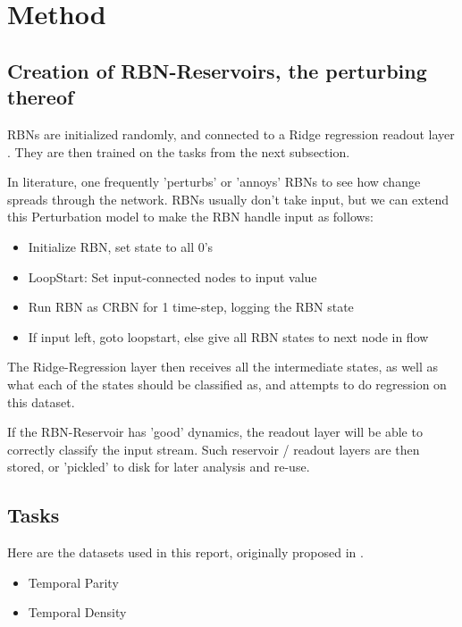 \section{Method}

\subsection{Creation of RBN-Reservoirs, the perturbing thereof}

RBNs are initialized randomly, and connected to a Ridge regression readout layer \cite{WhatIsRidgeRegression?}.
They are then trained on the tasks from the next subsection.

In literature, one frequently 'perturbs' or 'annoys' RBNs to see how change spreads through the network. \cite{CitationMissing}
RBNs usually don't take input, but we can extend this Perturbation model to make the RBN handle input as follows:

\begin{itemize}
  \item Initialize RBN, set state to all 0's
  \item LoopStart: Set input-connected nodes to input value
  \item Run RBN as CRBN for 1 time-step, logging the RBN state
  \item If input left, goto loopstart, else give all RBN states to next node in flow
\end{itemize}

The Ridge-Regression layer then receives all the intermediate states, as well as what each of the states should be classified as, and attempts to do regression on this dataset.

If the RBN-Reservoir has 'good' dynamics,
the readout layer will be able to correctly classify the input stream.
Such reservoir / readout layers are then stored, or 'pickled' to disk for later analysis and re-use.

\subsection{Tasks}

Here are the datasets used in this report, originally proposed in \cite{rbn-reservoir}.

\begin{itemize}
  \item Temporal Parity
  \item Temporal Density
\end{itemize}

